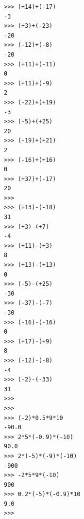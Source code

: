 \begin{lstlisting}
>>> (+14)+(-17)
-3
>>> (+3)+(-23)
-20
>>> (-12)+(-8)
-20
>>> (+11)+(-11)
0
>>> (+11)+(-9)
2
>>> (-22)+(+19)
-3
>>> (-5)+(+25)
20
>>> (-19)+(+21)
2
>>> (-16)+(+16)
0
>>> (+37)+(-17)
20
>>>
>>> (+13)-(-18)
31
>>> (+3)-(+7)
-4
>>> (+11)-(+3)
8
>>> (+13)-(+13)
0
>>> (-5)-(+25)
-30
>>> (-37)-(-7)
-30
>>> (-16)-(-16)
0
>>> (+17)-(+9)
8
>>> (-12)-(-8)
-4
>>> (-2)-(-33)
31
>>>
>>>
>>> (-2)*0.5*9*10
-90.0
>>> 2*5*(-0.9)*(-10)
90.0
>>> 2*(-5)*(-9)*(-10)
-900
>>> -2*5*9*(-10)
900
>>> 0.2*(-5)*(-0.9)*10
9.0
>>>
\end{lstlisting}